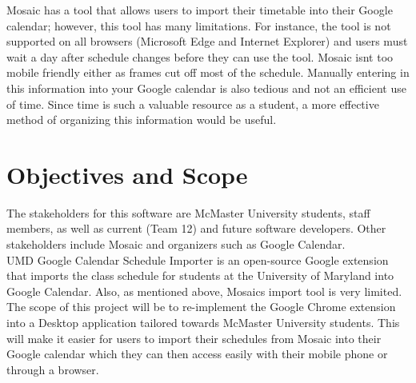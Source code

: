 \documentclass{article}
\begin{document}
Mosaic has a tool that allows users to import their timetable into their Google calendar; however, this tool has many limitations. For instance, the tool is not supported on all browsers (Microsoft Edge and Internet Explorer) and users must wait a day after schedule changes before they can use the tool. Mosaic isn\textsc{}t too mobile friendly either as frames cut off most of the schedule. Manually entering in this information into your Google calendar is also tedious and not an efficient use of time. Since time is such a valuable resource as a student, a more effective method of organizing this information would be useful.


\section{Objectives and Scope}
\hspace{5mm}The stakeholders for this software are McMaster University students, staff members, as well as current (Team 12) and future software developers. Other stakeholders include Mosaic and organizers such as Google Calendar.\\

UMD Google Calendar Schedule Importer is an open-source Google extension that imports the class schedule for students at the University of Maryland into Google Calendar. Also, as mentioned above, Mosaic\textsc{}s import tool is very limited. The scope of this project will be to re-implement the Google Chrome extension into a  Desktop application tailored towards McMaster University students. This will make it easier for users to import their schedules from Mosaic into their Google calendar which they can then access easily with their mobile phone or through a browser.






\end{document}
